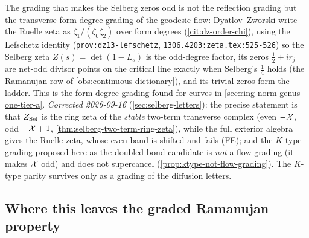 \begin{observation}
\label{obs:selberg-grading-choice}
The grading that makes the Selberg zeros odd is not the reflection grading but the transverse
form-degree grading of the geodesic flow: Dyatlov--Zworski write the Ruelle zeta as
$\zeta_1/(\zeta_0\zeta_2)$ over form degrees (\cref{cit:dz-order-chi}), using the Lefschetz
identity (\texttt{prov:dz13-lefschetz}, \texttt{1306.4203:zeta.tex:525-526})
{\small\texttt{}}
so the Selberg zeta $Z(s) = \det(1-L_s)$ is the odd-degree factor, its zeros $\tfrac12\pm ir_j$ are
net-odd divisor points on the critical line exactly when Selberg's $\tfrac14$ holds (the Ramanujan
row of \cref{obs:continuous-dictionary}), and its trivial zeros form the ladder. This is the
form-degree grading found for curves in \cref{sec:ring-norm-genus-one-tier-a}. \emph{Corrected
2026-09-16} (\cref{sec:selberg-letters}): the precise statement is that $Z_{\mathrm{Sel}}$ is the ring zeta
of the \emph{stable} two-term transverse complex (even $-\mathcal X$, odd $-\mathcal X+1$,
\cref{thm:selberg-two-term-ring-zeta}), while the full exterior algebra gives the Ruelle zeta,
whose even band is shifted and fails (FE); and the $K$-type grading proposed here as the doubled-bond
candidate is \emph{not} a flow grading (it makes $\mathcal X$ odd) and does not supercancel
(\cref{prop:ktype-not-flow-grading}). The $K$-type parity survives only as a grading of the
diffusion letters.
\end{observation}

\subsection{Where this leaves the graded Ramanujan property}

